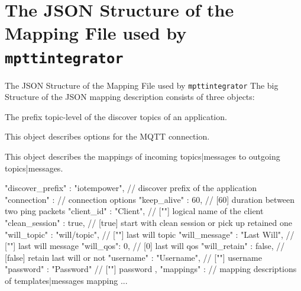 ﻿\section[nosectionpage]{The JSON Structure of the Mapping File used by \texttt{mpttintegrator}}

\begin{frame}[fragile]{The JSON Structure of the Mapping File used by \texttt{mpttintegrator}}
  The big Structure of the JSON mapping description consists of three objects:
  \begin{description}[connection]
    \item[discover\_prefix] The prefix topic-level of the discover topics of an application.
    \item[connection] This object describes options for the MQTT connection.
    \item[mappings] This object describes the mappings of incoming topics|messages to outgoing topics|messages.
  \end{description}

  \begin{jsoncode}[gobble=4]
    {
        "discover_prefix" : "iotempower",  // discover prefix of the application
        "connection" : {                   // connection options
            "keep_alive" : 60,             // [60]    duration between two ping packets
            "client_id" : "Client",        // [""]    logical name of the client
            "clean_session" : true,        // [true]  start with clean session or pick up retained one
            "will_topic" : "will/topic",   // [""]    last will topic
            "will_message" : "Last Will",  // [""]    last will message
            "will_qos": 0,                 // [0]     last will qos
            "will_retain" : false,         // [false] retain last will or not
            "username" : "Username",       // [""]    username
            "password" : "Password"        // [""]    password
        },
        "mappings" : {                     // mapping descriptions of templates|messages mapping
            ...
        }
    }
  \end{jsoncode}
\end{frame}


